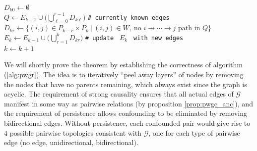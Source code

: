 \documentclass[12pt]{article}
\def\gcg{\mathcal{G}}  %
\newcommand{\gcgpath}[2]{#1 \rightarrow \cdots \rightarrow #2}  %
\begin{document}
\begin{theorem}
\begin{algorithm}
{      $D_{k0} \leftarrow \emptyset$\\
      {
        $Q \leftarrow E_{k - 1} \cup \big(\bigcup_{\ell = 0}^{r - 1} D_{k\ell}\big)$ \texttt{\# currently known edges}\\
        $D_{kr} \leftarrow \{(i, j) \in P_{k - r} \times P_k\ |\ (i, j) \in W,\ \text{no } \gcgpath{i}{j} \text{ path in } Q\}$
      }
      $E_k \leftarrow E_{k - 1} \cup \big(\bigcup_{r = 1}^k D_{kr}\big)$ \texttt{\# update } $E_k$ \texttt{ with new edges}\\
      \;
      $k \leftarrow k + 1$
    }
  \end{algorithm}
\end{theorem}

We will shortly prove the theorem by establishing the correctness of
algorithm (\ref{alg:pwgr}).  The idea is to iteratively ``peel away
layers'' of nodes by removing the nodes that have no parents
remaining, which always exist since the graph is acyclic.  The
requirement of strong causality ensures that all actual edges of
$\gcg$ manifest in some way as pairwise relations (by proposition
\ref{prop:pwgc_anc}), and the requirement of persistence allows
confounding to be eliminated by removing bidirectional edges.  Without
persistence, each confounded pair would give rise to $4$ possible
pairwise topologies consistent with $\gcg$, one for each type of
pairwise edge (no edge, unidirectional, bidirectional).
\end{document}
